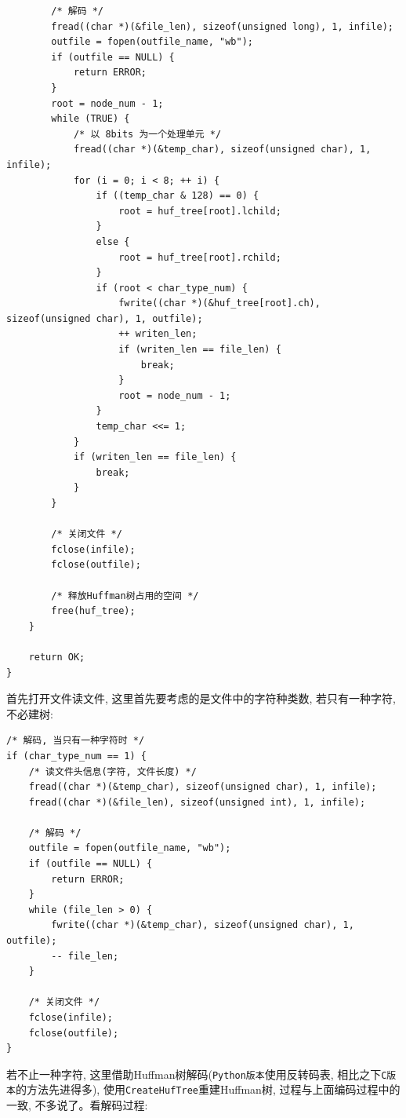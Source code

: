 \documentclass{ctexart}
\begin{document}
{\begin{lstlisting}
        /* 解码 */
        fread((char *)(&file_len), sizeof(unsigned long), 1, infile);
        outfile = fopen(outfile_name, "wb");
        if (outfile == NULL) {
            return ERROR;
        }
        root = node_num - 1;
        while (TRUE) {
            /* 以 8bits 为一个处理单元 */
            fread((char *)(&temp_char), sizeof(unsigned char), 1, infile);
            for (i = 0; i < 8; ++ i) {
                if ((temp_char & 128) == 0) {
                    root = huf_tree[root].lchild;
                }
                else {
                    root = huf_tree[root].rchild;
                }
                if (root < char_type_num) {
                    fwrite((char *)(&huf_tree[root].ch), sizeof(unsigned char), 1, outfile);
                    ++ writen_len;
                    if (writen_len == file_len) {
                        break;
                    }
                    root = node_num - 1;
                }
                temp_char <<= 1;
            }
            if (writen_len == file_len) {
                break;
            }
        }

        /* 关闭文件 */
        fclose(infile);
        fclose(outfile);

        /* 释放Huffman树占用的空间 */
        free(huf_tree);
    }

    return OK;
}
\end{lstlisting}}

首先打开文件读文件, 这里首先要考虑的是文件中的字符种类数, 若只有一种字符, 不必建树:

{\setmainfont{Courier New Bold}              
\begin{lstlisting}
/* 解码, 当只有一种字符时 */
if (char_type_num == 1) {
    /* 读文件头信息(字符, 文件长度) */
    fread((char *)(&temp_char), sizeof(unsigned char), 1, infile);
    fread((char *)(&file_len), sizeof(unsigned int), 1, infile);

    /* 解码 */
    outfile = fopen(outfile_name, "wb");
    if (outfile == NULL) {
        return ERROR;
    }
    while (file_len > 0) {
    	fwrite((char *)(&temp_char), sizeof(unsigned char), 1, outfile);
        -- file_len;
    }

    /* 关闭文件 */
    fclose(infile);
    fclose(outfile);
}
\end{lstlisting}}

若不止一种字符, 这里借助Huffman树解码(\texttt{Python版本}使用反转码表, 相比之下\texttt{C版本}的方法先进得多), 使用\texttt{CreateHufTree}重建Huffman树, 过程与上面编码过程中的一致, 不多说了。看解码过程:
\end{document}
